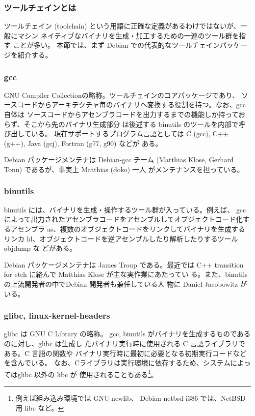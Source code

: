 \documentclass[mingoth,a4paper]{jsarticle}
\begin{document}
\subsubsection{ツールチェインとは}

   ツールチェイン (toolchain) という用語に正確な定義があるわけではないが、一般にマシン
   ネイティブなバイナリを生成・加工するための一連のツール群を指す
   ことが多い。
   本節では、まず Debian での代表的なツールチェインパッケージを紹介する。

  \subsubsection{gcc}

    GNU Compiler Collectionの略称。ツールチェインのコアパッケージであり、
    ソースコードからアーキテクチャ毎のバイナリへ変換する役割を持つ。なお、gcc 自体は
    ソースコードからアセンブラコードを出力するまでの機能しか持っておらず、そこから先のバイナリ生成部分
    は後述する
    binutils のツールを内部で呼び出している。
    現在サポートするプログラム言語としては C (gcc), C++ (g++), Java
    (gcj), Fortran (g77, g90) などが
    ある。

    Debian パッケージメンテナは Debian-gcc チーム 
    (Matthias Klose, Gerhard Tonn) であるが、事実上 Matthias (doko) 一人
    がメンテナンスを担っている。

  \subsubsection{binutils}

    binutils には、バイナリを生成・操作するツール群が入っている。例えば、
    gcc によって出力されたアセンブラコードをアセンブルしてオブジェクトコード化するアセンブラ
    as、複数のオブジェクトコードをリンクしてバイナリを生成するリンカ
    ld、オブジェクトコードを逆アセンブルしたり解析したりするツール objdump な
    どがある。

    Debian パッケージメンテナは James Troup である。最近では C++
    transition for etch に絡んで Matthias Klose が主な実作業にあたってい
    る。また、binutils の上流開発者の中でDebian 開発者も兼任している人
    物に Daniel Jacobowitz がいる。

  \subsubsection{glibc, linux-kernel-headers}

    glibc は GNU C Library の略称。
    gcc, binutils がバイナリを生成するものであるのに対し、glibc は生成し
    たバイナリ実行時に使用される C 言語ライブラリである。C 言語の関数や
    バイナリ実行時に最初に必要となる初期実行コードなどを含んでいる。
    なお、Cライブラリは実行環境に依存するため、システムによってはglibc 以外の libc が
    使用されることもある\footnote{例えば組み込み環境では GNU newlib、
    Debian netbsd-i386 では、NetBSD 用 libc など。}。
\end{document}
